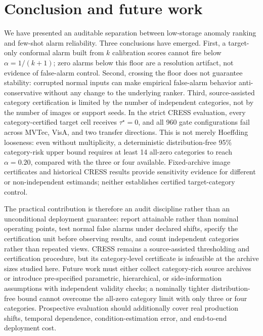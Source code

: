 \section{Conclusion and future work}\label{sec:conclusion}
We have presented an auditable separation between low-storage anomaly ranking and few-shot alarm reliability. Three conclusions have emerged. First, a target-only conformal alarm built from $k$ calibration scores cannot fire below $\alpha=1/(k{+}1)$; zero alarms below this floor are a resolution artifact, not evidence of false-alarm control. Second, crossing the floor does not guarantee stability: corrupted normal inputs can make empirical false-alarm behavior anti-conservative without any change to the underlying ranker. Third, source-assisted category certification is limited by the number of independent categories, not by the number of images or support seeds. In the strict CRESS evaluation, every category-certified target cell receives $\tau^\star=0$, and all 960 gate configurations fail across MVTec, VisA, and two transfer directions. This is not merely Hoeffding looseness: even without multiplicity, a deterministic distribution-free 95\% category-risk upper bound requires at least 14 all-zero categories to reach $\alpha=0.20$, compared with the three or four available. Fixed-archive image certificates and historical CRESS results provide sensitivity evidence for different or non-independent estimands; neither establishes certified target-category control.

The practical contribution is therefore an audit discipline rather than an unconditional deployment guarantee: report attainable rather than nominal operating points, test normal false alarms under declared shifts, specify the certification unit before observing results, and count independent categories rather than repeated views. CRESS remains a source-assisted thresholding and certification procedure, but its category-level certificate is infeasible at the archive sizes studied here. Future work must either collect category-rich source archives or introduce pre-specified parametric, hierarchical, or side-information assumptions with independent validity checks; a nominally tighter distribution-free bound cannot overcome the all-zero category limit with only three or four categories. Prospective evaluation should additionally cover real production shifts, temporal dependence, condition-estimation error, and end-to-end deployment cost.
